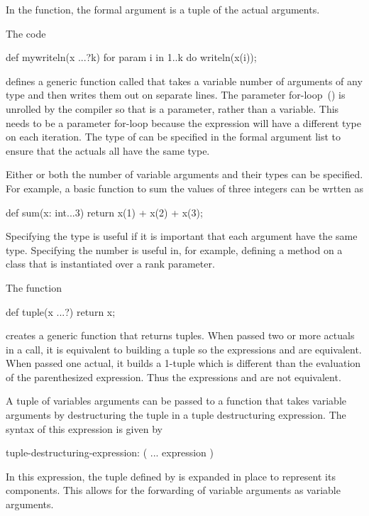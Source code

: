 In the function, the formal argument is a tuple of the actual
arguments.

\begin{example}
The code
\begin{chapel}
def mywriteln(x ...?k) {
  for param i in 1..k do
    writeln(x(i));
}
\end{chapel}
defines a generic function called  that takes a
variable number of arguments of any type and then writes them out on
separate lines.  The parameter for-loop~()
is unrolled by the compiler so that  is a parameter, rather
than a variable.  This needs to be a parameter for-loop because the
expression  will have a different type on each iteration.
The type of  can be specified in the formal argument list to
ensure that the actuals all have the same type.
\end{example}

\begin{example}
Either or both the number of variable arguments and their types can be
specified.  For example, a basic function to sum the values of three
integers can be wrtten as
\begin{chapel}
def sum(x: int...3) return x(1) + x(2) + x(3);
\end{chapel}
Specifying the type is useful if it is important that each argument
have the same type.  Specifying the number is useful in, for example,
defining a method on a class that is instantiated over a rank
parameter.
\end{example}

\begin{example}
The function
\begin{chapel}
def tuple(x ...?) return x;
\end{chapel}
creates a generic function that returns tuples.  When passed two or
more actuals in a call, it is equivalent to building a tuple so the
expressions  and  are equivalent.  When
passed one actual, it builds a 1-tuple which is different than the
evaluation of the parenthesized expression.  Thus the
expressions  and  are not equivalent.
\end{example}

A tuple of variables arguments can be passed to a function that takes
variable arguments by destructuring the tuple in a tuple destructuring
expression.  The syntax of this expression is given by
\begin{syntax}
tuple-destructuring-expression:
  ( ... expression )
\end{syntax}
In this expression, the tuple defined by  is expanded
in place to represent its components.  This allows for the forwarding
of variable arguments as variable arguments.
